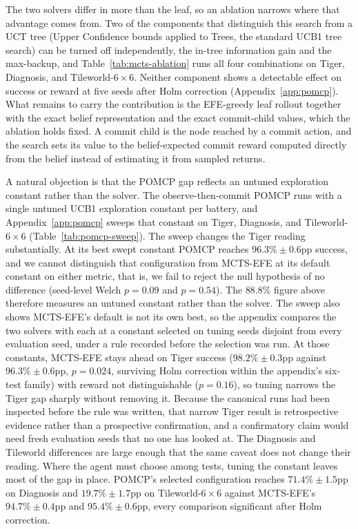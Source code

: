 The two solvers differ in more than the leaf, so an ablation narrows where that advantage comes from. Two of the components that distinguish this search from a UCT tree (Upper Confidence bounds applied to Trees, the standard UCB1 tree search) can be turned off independently, the in-tree information gain and the max-backup, and Table~\ref{tab:mcts-ablation} runs all four combinations on Tiger, Diagnosis, and Tileworld-$6{\times}6$. Neither component shows a detectable effect on success or reward at five seeds after Holm correction (Appendix~\ref{app:pomcp}). What remains to carry the contribution is the EFE-greedy leaf rollout together with the exact belief representation and the exact commit-child values, which the ablation holds fixed. A commit child is the node reached by a commit action, and the search sets its value to the belief-expected commit reward computed directly from the belief instead of estimating it from sampled returns.

A natural objection is that the POMCP gap reflects an untuned exploration constant rather than the solver. The observe-then-commit POMCP runs with a single untuned UCB1 exploration constant per battery, and Appendix~\ref{app:pomcp} sweeps that constant on Tiger, Diagnosis, and Tileworld-$6{\times}6$ (Table~\ref{tab:pomcp-sweep}). The sweep changes the Tiger reading substantially. At its best swept constant POMCP reaches $96.3\% \pm 0.6$pp success, and we cannot distinguish that configuration from MCTS-EFE at its default constant on either metric, that is, we fail to reject the null hypothesis of no difference (seed-level Welch $p{=}0.09$ and $p{=}0.54$). The $88.8\%$ figure above therefore measures an untuned constant rather than the solver. The sweep also shows MCTS-EFE's default is not its own best, so the appendix compares the two solvers with each at a constant selected on tuning seeds disjoint from every evaluation seed, under a rule recorded before the selection was run. At those constants, MCTS-EFE stays ahead on Tiger success ($98.2\% \pm 0.3$pp against $96.3\% \pm 0.6$pp, $p{=}0.024$, surviving Holm correction within the appendix's six-test family) with reward not distinguishable ($p{=}0.16$), so tuning narrows the Tiger gap sharply without removing it. Because the canonical runs had been inspected before the rule was written, that narrow Tiger result is retrospective evidence rather than a prospective confirmation, and a confirmatory claim would need fresh evaluation seeds that no one has looked at. The Diagnosis and Tileworld differences are large enough that the same caveat does not change their reading. Where the agent must choose among tests, tuning the constant leaves most of the gap in place. POMCP's selected configuration reaches $71.4\% \pm 1.5$pp on Diagnosis and $19.7\% \pm 1.7$pp on Tileworld-$6{\times}6$ against MCTS-EFE's $94.7\% \pm 0.4$pp and $95.4\% \pm 0.6$pp, every comparison significant after Holm correction.

